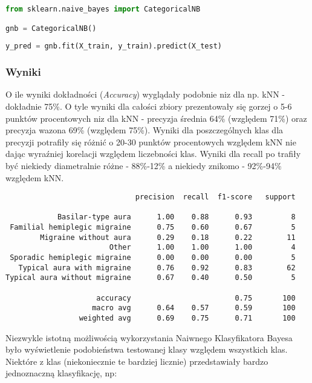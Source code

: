 \begin{lstlisting}[language=Python, caption=Definicja i uzycie CategoricalNB]
from sklearn.naive_bayes import CategoricalNB

gnb = CategoricalNB()
    
y_pred = gnb.fit(X_train, y_train).predict(X_test)
\end{lstlisting}    

\subsubsection{Wyniki}
O ile wyniki dokładności (\textit{Accuracy}) wyglądały podobnie niz dla np. kNN - dokładnie 75\%. O tyle wyniki dla całości zbiory prezentowały się gorzej o 5-6 punktów procentowych niz dla kNN - precyzja średnia 64\% (względem 71\%) oraz precyzja wazona 69\% (względem 75\%). Wyniki dla poszczególnych klas dla precyzji potrafiły się różnić o 20-30 punktów procentowych względem kNN nie dając wyraźniej korelacji względem liczebności klas. Wyniki dla recall po trafiły być niekiedy diametralnie różne - 88\%-12\% a niekiedy znikomo - 92\%-94\% względem kNN.\\

\begin{verbatim}
                              precision  recall  f1-score   support

            Basilar-type aura      1.00    0.88      0.93         8
 Familial hemiplegic migraine      0.75    0.60      0.67         5
        Migraine without aura      0.29    0.18      0.22        11
                        Other      1.00    1.00      1.00         4
 Sporadic hemiplegic migraine      0.00    0.00      0.00         5
   Typical aura with migraine      0.76    0.92      0.83        62
Typical aura without migraine      0.67    0.40      0.50         5

                     accuracy                        0.75       100
                    macro avg      0.64    0.57      0.59       100
                 weighted avg      0.69    0.75      0.71       100
\end{verbatim}

Niezwykle istotną możliwością wykorzystania Naiwnego Klasyfikatora Bayesa było wyświetlenie podobieństwa testowanej klasy względem wszystkich klas.\\

Niektóre z klas (niekoniecznie te bardziej licznie) przedstawiały bardzo jednoznaczną klasyfikację, np:\\

